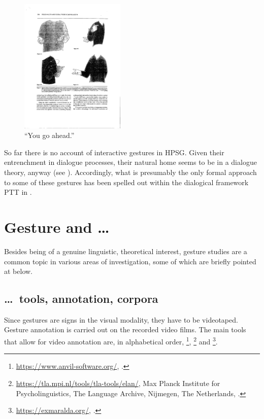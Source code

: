 \documentclass[output=paper
                ,modfonts
                ,nonflat
	        ,collection
	        ,collectionchapter
	        ,collectiontoclongg
 	        ,biblatex
                ,babelshorthands
                ,newtxmath
                ,draftmode
                ,colorlinks, citecolor=brown
]{./langsci/langscibook}
\begin{document}
\begin{figure}
  \centering
  \includegraphics[trim={11cm 4cm 13cm 10.5cm}, clip, angle=90, width=5cm]{figures/InteractiveGestures}
\caption{\enquote{You go ahead.}}
\label{fig:yourturn}
\end{figure}

So far there is no account of interactive gestures in HPSG. 
%
Given their entrenchment in dialogue processes, their natural home seems to be in a dialogue theory, anyway (see ).
%
Accordingly, what is presumably the only formal approach to some of these gestures has been spelled out within the dialogical framework PTT in \citet{Rieser:Poesio:2009}.




\section{Gesture and \ldots}
\label{sec:gesture-and}

Besides being of a genuine linguistic, theoretical interest, gesture studies are a common topic in various areas of investigation, some of which are briefly pointed at below. 


\subsection{\ldots\ tools, annotation, corpora}
\label{sec:tools-annotation-corpora}

Since gestures are signs in the visual modality, they have to be videotaped.
%
Gesture annotation is carried out on the recorded video films.
%
The main tools that allow for video annotation are, in alphabetical order, \footnote{%
\url{https://www.anvil-software.org/}, \citealp{Kipp:2014}.
}, \footnote{%
\url{https://tla.mpi.nl/tools/tla-tools/elan/}, Max Planck Institute for Psycholinguistics, The
Language Archive, Nijmegen, The Netherlands, \citealp{Sloetjes:Wittenburg:2008}.}
and \footnote{%
\url{https://exmaralda.org/}, \citealp{Schmidt:2012}.
}.
\end{document}

